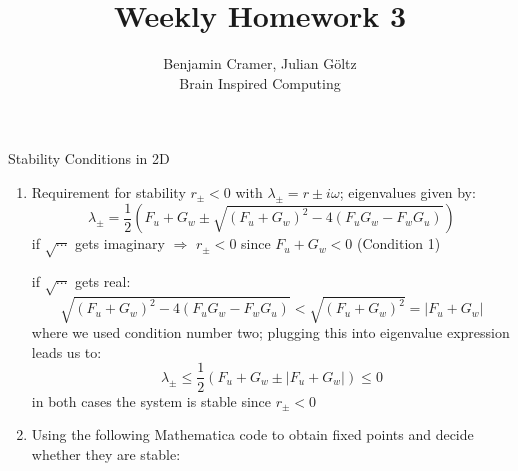 \documentclass[12pt]{article}
\newenvironment{exercise}[2][Exercise]{\begin{trivlist}
\item[\hskip \labelsep {\bfseries #1}\hskip \labelsep {\bfseries #2.}]}{\end{trivlist}}
\newcommand{\removed}[1]{\cbstart\removedfragile{#1}\cbend{}}
\newcommand{\removedfragile}[1]{{\color{red}{#1}}{}}
\newcommand{\added}[1]{
		{#1}
}
\newcommand{\addedfragile}[1]{{\color{green!50!black}{#1}}{}}
\newcommand{\changed}[2]{
		{#1}
}
\begin{document}
 
 
\title{Weekly Homework 3}
\author{Benjamin Cramer, Julian G\"oltz\\
Brain Inspired Computing}
 
\maketitle
 
\begin{exercise}{3.1}
Stability Conditions in 2D \\
\renewcommand{\labelenumi}{\alph{enumi})}
\begin{enumerate}
\item Requirement for stability $r_\pm < 0$ \changed{with}{wit} $\lambda_\pm = r \pm \added{i} \omega$; eigenvalues given by:
	\begin{equation}
		\lambda_\pm = \frac{1}{2}\left( F_u + G_w \pm \sqrt{(F_u + G_w)^2 - 4(F_uG_w - F_w G_u)}\right)
	\end{equation}
	if $\sqrt{\cdots}$ gets imaginary $\Rightarrow$ $r_\pm <0$ since $F_u+G_w < 0$ \added{(Condition 1)}
	if $\sqrt{\cdots}$ gets real:
	\begin{equation}
		\sqrt{(F_u + G_w)^2 - 4(F_uG_w - F_w G_u)} < \sqrt{(F_u + G_w)^2} = |F_u + G_w|
	\end{equation}
	where we used condition number two; plugging this into eigenvalue expression leads us to:
	\begin{equation}
		\lambda_\pm \leq \frac{1}{2}(F_u + G_w \pm |F_u + G_w|) \leq 0
	\end{equation}
	in both cases the system is stable since $r_\pm < 0$
\item Using the following Mathematica code to obtain fixed points and decide whether they are stable:


\end{enumerate}
\end{exercise}
\end{document}
